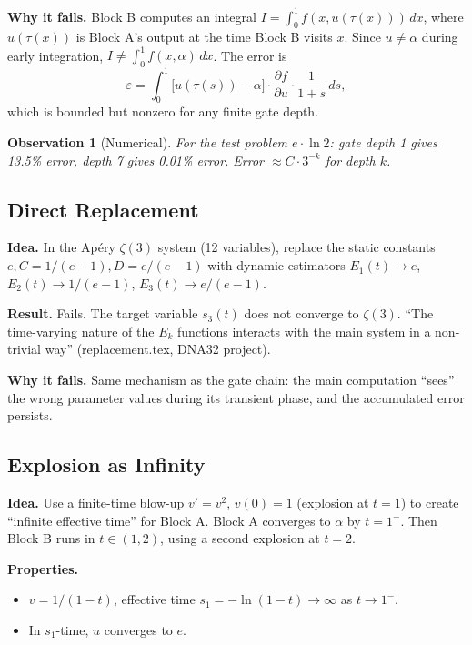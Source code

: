 \documentclass[11pt]{article}
\newtheorem{observation}{Observation}
\theoremstyle{definition}
\theoremstyle{remark}
\begin{document}
\textbf{Why it fails.} Block B computes an integral $I = \int_0^1 f(x, u(\tau(x)))\,dx$, where $u(\tau(x))$ is Block A's output at the time Block B visits $x$. Since $u \neq \alpha$ during early integration, $I \neq \int_0^1 f(x,\alpha)\,dx$. The error is
\[
  \varepsilon = \int_0^1 \bigl[u(\tau(s)) - \alpha\bigr] \cdot \frac{\partial f}{\partial u} \cdot \frac{1}{1+s}\,ds,
\]
which is bounded but nonzero for any finite gate depth.

\begin{observation}[Numerical]
For the test problem $e \cdot \ln 2$: gate depth 1 gives 13.5\% error, depth 7 gives 0.01\% error. Error $\approx C \cdot 3^{-k}$ for depth $k$.
\end{observation}

\subsection{Direct Replacement}

\textbf{Idea.} In the Apéry $\zeta(3)$ system (12 variables), replace the static constants $e, C=1/(e-1), D=e/(e-1)$ with dynamic estimators $E_1(t) \to e$, $E_2(t) \to 1/(e-1)$, $E_3(t) \to e/(e-1)$.

\textbf{Result.} Fails. The target variable $s_3(t)$ does not converge to $\zeta(3)$. ``The time-varying nature of the $E_k$ functions interacts with the main system in a non-trivial way'' (replacement.tex, DNA32 project).

\textbf{Why it fails.} Same mechanism as the gate chain: the main computation ``sees'' the wrong parameter values during its transient phase, and the accumulated error persists.

\subsection{Explosion as Infinity}

\textbf{Idea.} Use a finite-time blow-up $v' = v^2$, $v(0) = 1$ (explosion at $t=1$) to create ``infinite effective time'' for Block A. Block A converges to $\alpha$ by $t = 1^-$. Then Block B runs in $t \in (1,2)$, using a second explosion at $t=2$.

\textbf{Properties.}
\begin{itemize}
  \item $v = 1/(1-t)$, effective time $s_1 = -\ln(1-t) \to \infty$ as $t \to 1^-$.
  \item In $s_1$-time, $u$ converges to $e$. \checkmark
\end{itemize}
\end{document}
